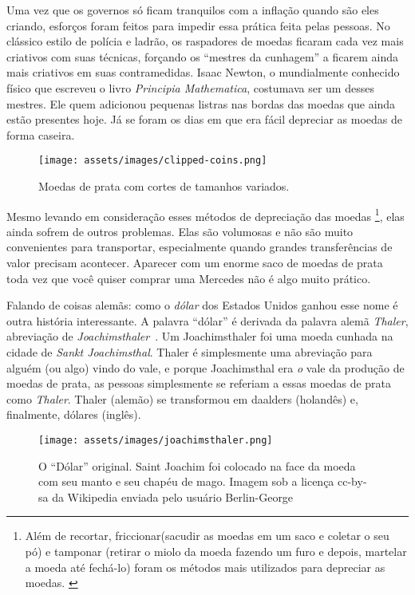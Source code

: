Uma vez que os governos só ficam tranquilos com a inflação quando são eles criando, esforços foram feitos para impedir essa prática feita pelas pessoas. No clássico estilo de polícia e ladrão, os raspadores de moedas ficaram cada vez mais criativos com suas técnicas, forçando os \enquote{mestres da cunhagem} a ficarem ainda mais criativos em suas contramedidas. Isaac Newton, o mundialmente conhecido físico que escreveu o livro \textit{Principia Mathematica}, costumava ser um desses mestres. Ele quem adicionou pequenas listras nas bordas das moedas que ainda estão presentes hoje. Já se foram os dias em que era fácil depreciar as moedas de forma caseira.

\begin{figure}
  \texttt{[image: assets/images/clipped-coins.png]}
  \caption{Moedas de prata com cortes de tamanhos variados.}
  \label{fig:clipped-coins}
\end{figure}

Mesmo levando em consideração esses métodos de depreciação das moedas \footnote{Além de recortar, friccionar(sacudir as moedas em um saco e coletar o seu pó) e tamponar (retirar o miolo da moeda fazendo um furo e depois, martelar a moeda até fechá-lo) foram os métodos mais utilizados para depreciar as moedas. \cite{wiki:coin-debasement}}, elas ainda sofrem de outros problemas. Elas são volumosas e não são muito convenientes para transportar, especialmente quando grandes transferências de valor precisam acontecer. Aparecer com um enorme saco de moedas de prata toda vez que você quiser comprar uma Mercedes não é algo muito prático.

Falando de coisas alemãs: como o \textit{dólar} dos Estados Unidos ganhou esse nome é outra história interessante. A palavra \enquote{dólar} é derivada da palavra alemã \textit{Thaler}, abreviação de \textit{Joachimsthaler}~\cite{wiki:thaler}. Um Joachimsthaler foi uma moeda cunhada na cidade de \textit{Sankt Joachimsthal}. Thaler é simplesmente uma abreviação para alguém (ou algo) vindo do vale, e porque Joachimsthal era \textit{o} vale da produção de moedas de prata, as pessoas simplesmente se referiam a essas moedas de prata como \textit{Thaler}. Thaler (alemão) se transformou em daalders (holandês) e, finalmente, dólares (inglês).

\begin{figure}
  \centering
  \texttt{[image: assets/images/joachimsthaler.png]}
  \caption{O \enquote{Dólar} original. Saint Joachim foi colocado na face da moeda com seu manto e seu chapéu de mago. Imagem sob a licença cc-by-sa da Wikipedia enviada pelo usuário Berlin-George}
  \label{fig:joachimsthaler}
\end{figure}


